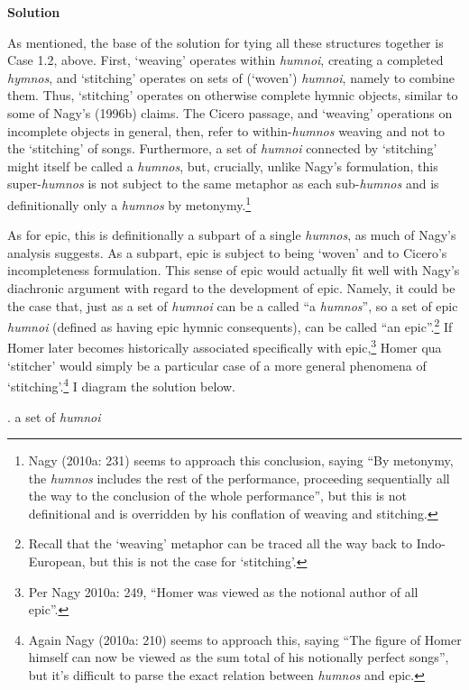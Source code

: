 \documentclass[12pt]{article}
\begin{document}
\noindent \hfill \par
\noindent \textbf{Solution}

As mentioned, the base of the solution for tying all these structures together is Case 1.2, above. First, `weaving' operates within \textit{humnoi}, creating a completed \textit{hymnos}, and `stitching' operates on sets of (`woven') \textit{humnoi}, namely to combine them. Thus, `stitching' operates on otherwise complete hymnic objects, similar to some of Nagy's (1996b) claims. The Cicero passage, and `weaving' operations on incomplete objects in general, then, refer to within-\textit{humnos} weaving and not to the `stitching' of songs. Furthermore, a set of \textit{humnoi} connected by `stitching' might itself be called a \textit{humnos}, but, crucially, unlike Nagy's formulation, this super-\textit{humnos} is not subject to the same metaphor as each sub-\textit{humnos} and is definitionally only a \textit{humnos} by metonymy.\footnote{ Nagy (2010a: 231) seems to approach this conclusion, saying ``By metonymy, the \textit{humnos} includes the rest of the performance, proceeding sequentially all the way to the conclusion of the whole performance'', but this is not definitional and is overridden by his conflation of weaving and stitching.} 

As for epic, this is definitionally a subpart of a single \textit{humnos}, as much of Nagy's analysis suggests. As a subpart, epic is subject to being `woven' and to Cicero's incompleteness formulation. This sense of epic would actually fit well with Nagy's diachronic argument with regard to the development of epic. Namely, it could be the case that, just as a set of \textit{humnoi} can be a called ``a \textit{humnos}'', so a set of epic \textit{humnoi} (defined as having epic hymnic consequents), can be called ``an epic''.\footnote{ Recall that the `weaving' metaphor can be traced all the way back to Indo-European, but this is not the case for `stitching'.} If Homer later becomes historically associated specifically with epic,\footnote{ Per Nagy 2010a: 249, ``Homer was viewed as the notional author of all epic''.} Homer qua `stitcher' would simply be a particular case of a more general phenomena of `stitching'.\footnote{ Again Nagy (2010a: 210) seems to approach this, saying ``The figure of Homer himself can now be viewed as the sum total of his notionally perfect songs'', but it's difficult to parse the exact relation between \textit{humnos} and epic.} I diagram the solution below.

\ex. a set of \textit{humnoi}
\end{document}
